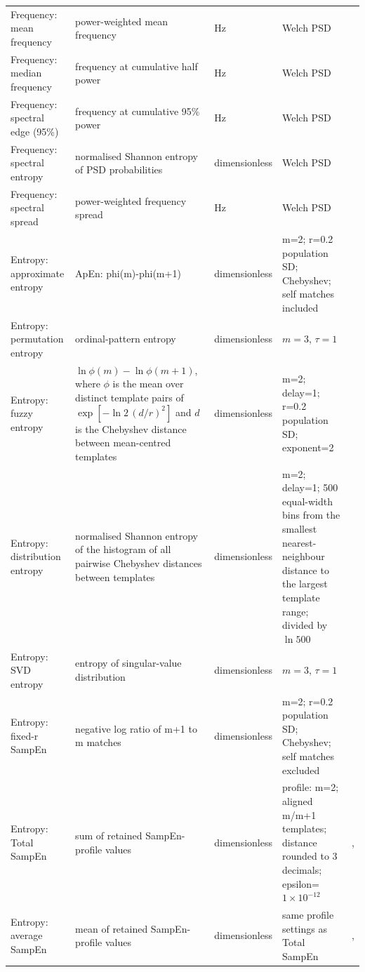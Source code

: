 \documentclass[10pt]{article}
\begin{document}
\begin{longtable}{p{3.4cm}p{6.2cm}p{2.0cm}p{4.7cm}p{3.2cm}}
Frequency: mean frequency & power-weighted mean frequency & Hz & Welch PSD & \citep{Welch1967PSD} \\
Frequency: median frequency & frequency at cumulative half power & Hz & Welch PSD & \citep{Welch1967PSD} \\
Frequency: spectral edge (95\%) & frequency at cumulative 95\% power & Hz & Welch PSD & \citep{Welch1967PSD} \\
Frequency: spectral entropy & normalised Shannon entropy of PSD probabilities & dimensionless & Welch PSD & \citep{Inouye1991EEGSpectralEntropy} \\
Frequency: spectral spread & power-weighted frequency spread & Hz & Welch PSD & \citep{Welch1967PSD} \\
Entropy: approximate entropy & ApEn: phi(m)-phi(m+1) & dimensionless & m=2; r=0.2 population SD; Chebyshev; self matches included & \citep{Pincus1991ApproximateEntropy} \\
Entropy: permutation entropy & ordinal-pattern entropy & dimensionless & $m=3$, $\tau=1$ & \citep{Bandt2002PermutationEntropy} \\
Entropy: fuzzy entropy & $\ln\phi(m)-\ln\phi(m+1)$, where $\phi$ is the mean over distinct template pairs of $\exp[-\ln 2\,(d/r)^2]$ and $d$ is the Chebyshev distance between mean-centred templates & dimensionless & m=2; delay=1; r=0.2 population SD; exponent=2 & \citep{Chen2007FuzzyEntropy} \\
Entropy: distribution entropy & normalised Shannon entropy of the histogram of all pairwise Chebyshev distances between templates & dimensionless & m=2; delay=1; 500 equal-width bins from the smallest nearest-neighbour distance to the largest template range; divided by $\ln 500$ & \citep{Li2015DistributionEntropy} \\
Entropy: SVD entropy & entropy of singular-value distribution & dimensionless & $m=3$, $\tau=1$ & \citep{Roberts1999SVDEntropy} \\
Entropy: fixed-r SampEn & negative log ratio of m+1 to m matches & dimensionless & m=2; r=0.2 population SD; Chebyshev; self matches excluded & \citep{Richman2000SampleEntropy} \\
Entropy: Total SampEn & sum of retained SampEn-profile values & dimensionless & profile: m=2; aligned m/m+1 templates; distance rounded to 3 decimals; epsilon=$1\times10^{-12}$ & \citep{Udhayakumar2018SampEnProfile},\citep{udhayakumar2020entropycodes} \\
Entropy: average SampEn & mean of retained SampEn-profile values & dimensionless & same profile settings as Total SampEn & \citep{Udhayakumar2018SampEnProfile},\citep{udhayakumar2020entropycodes} \\

\end{longtable}
\end{document}

